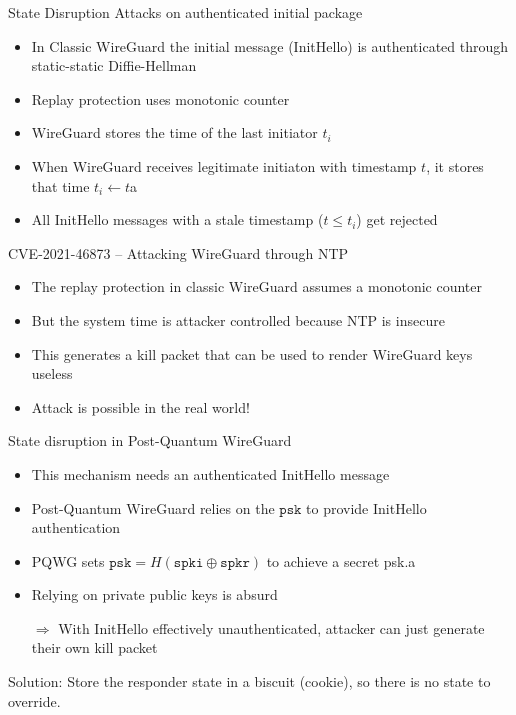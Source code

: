 \begin{frame}{State Disruption Attacks on authenticated initial package}
\begin{itemize}
  \item In Classic WireGuard the initial message (InitHello) is authenticated through static-static Diffie-Hellman
  \item Replay protection uses monotonic counter
  \item WireGuard stores the time of the last initiator $t_i$
  \item When WireGuard receives legitimate initiaton with timestamp $t$, it stores that time $t_i \leftarrow t$a
  \item All InitHello messages with a stale timestamp ($t \le t_i$) get rejected
\end{itemize}
\end{frame}

\begin{frame}{CVE-2021-46873 – Attacking WireGuard through NTP}
\begin{itemize}
  \item The replay protection in classic WireGuard assumes a monotonic counter
  \item But the system time is attacker controlled because NTP is insecure
  \item This generates a kill packet that can be used to render WireGuard keys useless
  \item Attack is possible in the real world!
\end{itemize}
\end{frame}

\begin{frame}{State disruption in Post-Quantum WireGuard}
\begin{itemize}
  \item This mechanism needs an authenticated InitHello message
  \item Post-Quantum WireGuard relies on the $\texttt{psk}$ to provide InitHello authentication
  \item PQWG sets $\texttt{psk} = H(\texttt{spki} \oplus \texttt{spkr})$ to achieve a secret psk.a
  \item Relying on private public keys is absurd
  \item[$\Rightarrow$] With InitHello effectively unauthenticated, attacker can just generate their own kill packet
\end{itemize}
  Solution: Store the responder state in a biscuit (cookie), so there is no state to override.
\end{frame}

